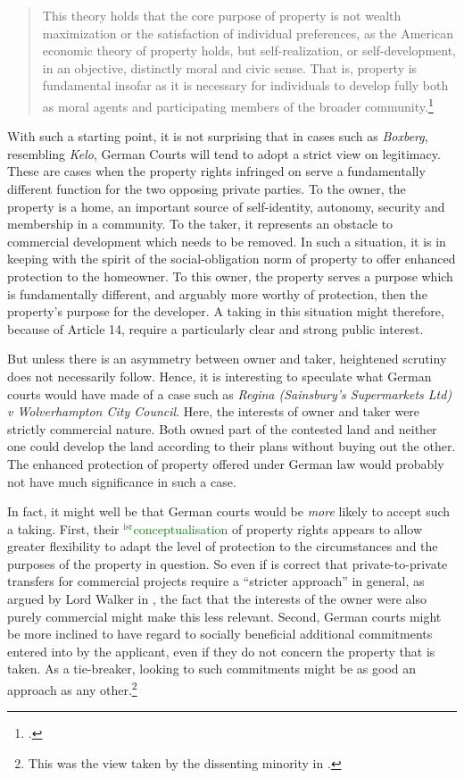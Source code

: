 \documentclass[12pt,a4paper]{book} %
\newcommand{\isr}[1]{\textcolor{green}{$^{\textrm{isr}}${#1}}}
\begin{document}
\begin{quote}
This theory holds that the core purpose of property is not wealth maximization or the satisfaction of individual preferences, as the American economic theory of property holds, but self-realization, or self-development, in an objective, distinctly moral and civic sense. That is, property is fundamental insofar as it is necessary for individuals to develop fully both
as moral agents and participating members of the broader community.\footcite[745]{alexander03}
\end{quote}

With such a starting point, it is not surprising that in cases such as {\it Boxberg}, resembling {\it Kelo}, German Courts will tend to adopt a strict view on legitimacy. These are cases when the property rights infringed on serve a fundamentally different function for the two opposing private parties. To the owner, the property is a home, an important source of self-identity, autonomy, security and membership in a community. To the taker, it represents an obstacle to commercial development which needs to be removed. In such a situation, it is in keeping with the spirit of the social-obligation norm of property to offer enhanced protection to the homeowner. To this owner, the property serves a purpose which is fundamentally different, and arguably more worthy of protection, then the property's purpose for the developer. A taking in this situation might therefore, because of Article 14, require a particularly clear and strong public interest.

But unless there is an asymmetry between owner and taker, heightened scrutiny does not necessarily follow. Hence, it is interesting to speculate what German courts would have made of a case such as {\it Regina (Sainsbury’s Supermarkets Ltd) v Wolverhampton City Council}. Here, the interests of owner and taker were strictly commercial nature. Both owned part of the contested land and neither one could develop the land according to their plans without buying out the other. The enhanced protection of property offered under German law would probably not have much significance in such a case. 

In fact, it might well be that German courts would be {\it more} likely to accept such a taking. First, their \isr{conceptualisation} of property rights appears to allow greater flexibility to adapt the level of protection to the circumstances and the purposes of the property in question. So even if is correct that private-to-private transfers for commercial projects require a ``stricter approach'' in general, as argued by Lord Walker in \textcite{sainsbury10}, the fact that the interests of the owner were also purely commercial  might make this less relevant. Second, German courts might be more inclined to have regard to socially beneficial additional commitments entered into by the applicant, even if they do not concern the property that is taken. As a tie-breaker, looking to such commitments might be as good an approach as any other.\footnote{This was the view taken by the dissenting minority in \textcite{sainsbury10}.}
\end{document}
